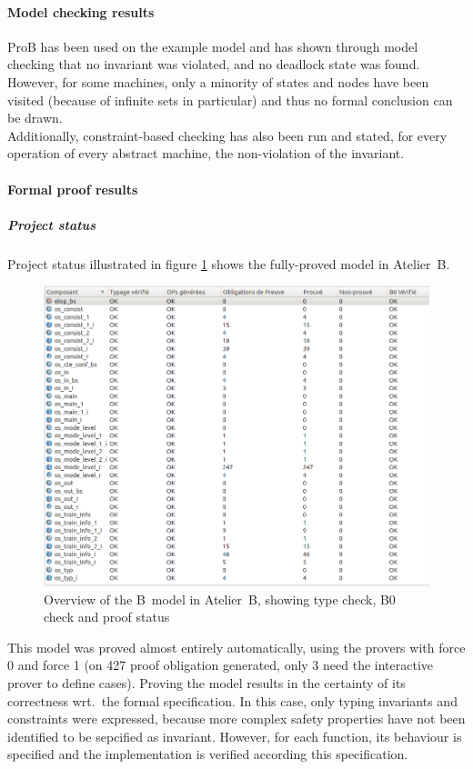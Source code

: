 \paragraph{Model checking results}
\label{subapp:mc}
ProB has been used on the example model and has shown through model checking that no invariant was violated, and no deadlock state was found. However, for some machines, only a minority of states and nodes have been visited (because of infinite sets in particular) and thus no formal conclusion can be drawn.\\
Additionally, constraint-based checking has also been run and stated, for every operation of every abstract machine, the non-violation of the invariant.

\paragraph{Formal proof results}
\label{subapp:proof}
\subparagraph{Project status}
Project status illustrated in figure \ref{fig:atelierb} shows the fully-proved model in Atelier~B. 

\begin{figure}[h!]
\centering
\includegraphics[width=1\textwidth]{figures/atelierb}
\caption{Overview of the B~model in Atelier~B, showing type check, B0 check and proof status}
\label{fig:atelierb}
\end{figure}

This model was proved almost entirely automatically, using the provers with
force 0 and force 1 (on 427 proof obligation generated, only 3 need the
interactive prover to define cases). Proving the model results in the certainty
of its correctness wrt.\ the formal specification. In this case, only typing
invariants and constraints were expressed, because more complex safety
properties have not been identified to be sepcified as invariant. However, for each function, its behaviour is specified and the implementation is verified according this specification.

